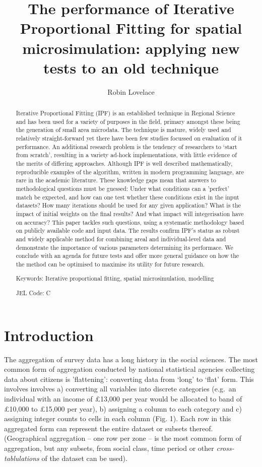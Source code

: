\documentclass[a4paper,10pt]{article}
\title{The performance of Iterative Proportional Fitting for spatial microsimulation: applying new tests to an old technique}
\author{Robin Lovelace}
\begin{document}
\maketitle

\begin{abstract}
Iterative Proportional Fitting (IPF)
is an established technique in Regional Science and
 has been used for a variety of purposes in the field, primary amongst these being 
the generation of small area microdata.  
The technique is mature, widely used and relatively straight-forward
yet there have been few studies focussed on evaluation of it performance. 
An additional research problem is the tendency of 
researchers to `start from scratch', resulting in a variety ad-hock implementations,
with little evidence of the merits of differing approaches.
Although IPF is well described mathematically, reproducible
examples of the algorithm, written in modern programming language, are rare in the academic literature.
These knowledge gaps mean that answers to methodological questions must be guessed:
Under what conditions can a 'perfect' 
match be expected, and how can one test whether these conditions exist in the input datasets?  
How many iterations should be used for any given application? 
What is the impact of initial weights on the final results? 
And what impact will integerisation have on accuracy?  
This paper tackles such questions, using a systematic methodology 
based on publicly available code and input data. 
The results confirm IPF's status as robust and widely applicable 
method for combining areal and individual-level data and demonstrate the importance
of various parameters determining its performace.
We conclude with an agenda for future tests and offer more general guidance on how the 
the method can be optimised to maximise its utility for future research.

Keywords: Iterative proportional fitting, spatial microsimulation, modelling

JEL Code: C
\end{abstract}

\section{Introduction}
The aggregation of survey data has a long history in the social sciences. 
The most common form of 
aggregation conducted by national statistical agencies collecting data about citizens 
is 'flattening': converting data from `long' to `flat' form. This involves involves a) converting all 
variables into discrete categories (e.g.~an individual with an income of £13,000 per year
would be allocated to band of £10,000 to £15,000 per year), b) assigning a column to each category and c) assigning 
integer counts to cells in each column (Fig. 1). Each row in this aggregated form can 
represent the entire dataset or subsets thereof. (Geographical aggregation – one row 
per zone – is the most common form of aggregation, but any subsets, from social class, 
time period or other \emph{cross-tablulations} of the dataset can be used).
\end{document}
